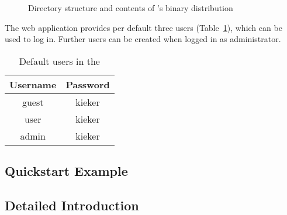 			\begin{figure}[h!]
				\begin{graybox}
				\end{graybox}
				
				\caption{Directory structure and contents of \KiekerWebGUI{}'s binary distribution}
				\label{fig:webgui-binary-layout}
			\end{figure}
			
			\noindent
			The web application provides per default three users (Table~\ref{tab:webgui-default-users}), which can be used to log in. Further users can be created when logged in as administrator.
			
			\begin{table}[h!]
				\center
				
				\begin{tabular}{|c|c|}
					\hline
					Username & Password\\
					\hline
					\hline
					guest    & kieker\\
					user     & kieker\\
					admin    & kieker\\
					\hline
				\end{tabular}
			
				\caption{Default users in the \KiekerWebGUI{}}
				\label{tab:webgui-default-users}
			\end{table}
			
		\subsection{Quickstart Example}
		
		
		\subsection{Detailed Introduction}
			
